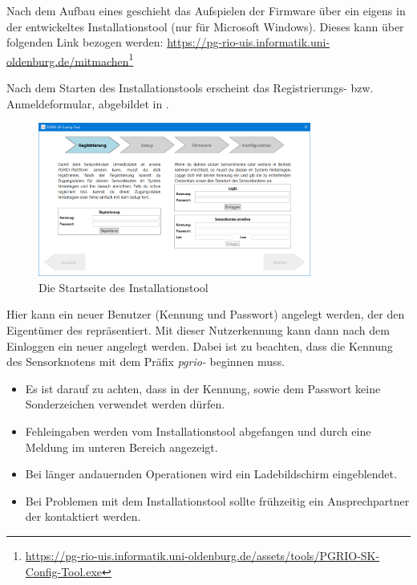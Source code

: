 Nach dem Aufbau eines \sk geschieht das Aufspielen der Firmware über ein eigens in der \pg entwickeltes Installationstool (nur für Microsoft Windows).
Dieses kann über folgenden Link bezogen werden: \url{https://pg-rio-uis.informatik.uni-oldenburg.de/mitmachen}\footnote{\url{https://pg-rio-uis.informatik.uni-oldenburg.de/assets/tools/PGRIO-SK-Config-Tool.exe}}
\FloatBarrier

Nach dem Starten des Installationstools erscheint das Registrierungs- bzw. Anmeldeformular, abgebildet in .
\begin{figure}[!htb]
	\centering
	\includegraphics[width=0.8\textwidth]{./ressourcen/i-tool/Registrierung}
	\caption{Die Startseite des Installationstool}
	\label{fig:skitool01}
\end{figure}
Hier kann ein neuer Benutzer (Kennung und Passwort) angelegt werden, der den Eigentümer des \sk repräsentiert.
Mit dieser Nutzerkennung kann dann nach dem Einloggen ein neuer \sk angelegt werden.
Dabei ist zu beachten, dass die Kennung des Sensorknotens mit dem Präfix \textit{pgrio-} beginnen muss.

\begin{mdframed}[frametitle=Weitere Hinweise]
	\begin{minipage}{\linewidth}
	    \begin{itemize}
	        \item Es ist darauf zu achten, dass in der Kennung, sowie dem Passwort keine Sonderzeichen verwendet werden dürfen.
	        \item Fehleingaben werden vom Installationstool abgefangen und durch eine Meldung im unteren Bereich angezeigt.
	        \item Bei länger andauernden Operationen wird ein Ladebildschirm eingeblendet.
	        \item Bei Problemen mit dem Installationstool sollte frühzeitig ein Ansprechpartner der \pg kontaktiert werden.
	    \end{itemize}
	\end{minipage}
\end{mdframed}

